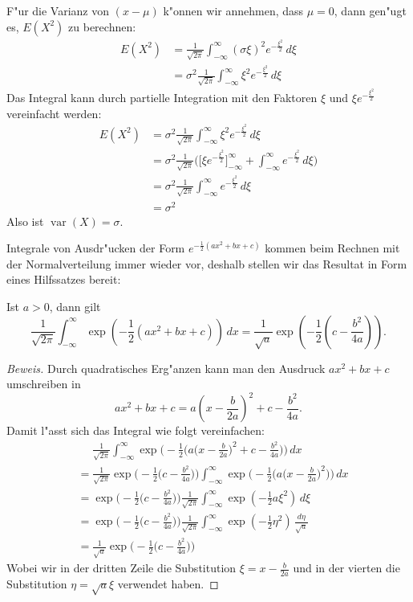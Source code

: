 F"ur die Varianz von $(x-\mu)$ k"onnen wir annehmen, dass $\mu=0$, dann
gen"ugt es, $E(X^2)$ zu berechnen:
\begin{align*}
E(X^2)
&=\frac1{\sqrt{2\pi}}\int_{-\infty}^{\infty}(\sigma\xi)^2e^{-\frac{\xi^2}2}\,d\xi\\
&=\sigma^2\frac{1}{\sqrt{2\pi}}\int_{-\infty}^{\infty}\xi^2e^{-\frac{\xi^2}2}\,d\xi
\end{align*}
Das Integral kann durch partielle Integration mit den Faktoren
$\xi$ und $\xi e^{-\frac{\xi^2}2}$ vereinfacht werden:
\begin{align*}
E(X^2)
&=\sigma^2\frac{1}{\sqrt{2\pi}}\int_{-\infty}^{\infty}\xi^2e^{-\frac{\xi^2}2}\,d\xi\\
&=\sigma^2\frac{1}{\sqrt{2\pi}}\biggl(
\biggl[\xi e^{-\frac{\xi^2}2}\biggr]_{-\infty}^{\infty}
+
\int_{-\infty}^{\infty}e^{-\frac{\xi^2}2}\,d\xi
\biggr)\\
&=\sigma^2\frac{1}{\sqrt{2\pi}}
\int_{-\infty}^{\infty}e^{-\frac{\xi^2}2}\,d\xi\\
&=\sigma^2
\end{align*}
Also ist $\operatorname{var}(X)=\sigma$.

Integrale von Ausdr"ucken der Form
$e^{-\frac12(ax^2+bx+c)}$
kommen beim Rechnen mit der Normalverteilung immer wieder vor, deshalb
stellen wir das Resultat in Form eines Hilfssatzes bereit:
\begin{hilfssatz}
\label{exp-quadr}
Ist $a>0$, dann gilt
\[
\frac1{\sqrt{2\pi}}\int_{-\infty}^{\infty}\exp\left(-\frac12(ax^2+bx+c)\right)\,dx
=
\frac1{\sqrt{a}}\exp\left(-\frac12\left(c-\frac{b^2}{4a}\right)\right).
\]
\end{hilfssatz}
\begin{proof}[Beweis]
Durch quadratisches Erg"anzen kann man den Ausdruck $ax^2+bx+c$ umschreiben in
\[
ax^2+bx+c=a\left(x-\frac{b}{2a}\right)^2+c-\frac{b^2}{4a}.
\]
Damit l"asst sich das Integral wie folgt vereinfachen:
\begin{align*}
&\phantom{=}\frac1{\sqrt{2\pi}}\int_{-\infty}^{\infty}\exp\biggl(-\frac12\biggl(
a\biggl(x-\frac{b}{2a}\biggr)^2+c-\frac{b^2}{4a}
\biggr)\biggr)\,dx\\
&=\frac1{\sqrt{2\pi}}
\exp\biggl(-\frac12\biggl(
c-\frac{b^2}{4a}
\biggr)\biggr)
\int_{-\infty}^{\infty}
\exp\biggl(-\frac12\biggl(
a\biggl(x-\frac{b}{2a}\biggr)^2
\biggr)\biggr)
\,dx\\
&=
\exp\biggl(-\frac12\biggl(
c-\frac{b^2}{4a}
\biggr)\biggr)
\frac1{\sqrt{2\pi}}
\int_{-\infty}^{\infty}
\exp\left(-\frac12
a\xi^2
\right)
\,d\xi\\
&=
\exp\biggl(-\frac12\biggl(
c-\frac{b^2}{4a}
\biggr)\biggr)
\frac1{\sqrt{2\pi}}
\int_{-\infty}^{\infty}
\exp\left(-\frac12
\eta^2
\right)
\,\frac{d\eta}{\sqrt{a}}\\
&=
\frac{1}{\sqrt{a}}
\exp\biggl(-\frac12\biggl(
c-\frac{b^2}{4a}
\biggr)\biggr)
\end{align*}
Wobei wir in der dritten Zeile die Substitution $\xi=x-\frac{b}{2a}$
und in der vierten die Substitution
$\eta=\sqrt{a}\xi$
verwendet haben.
\end{proof}

